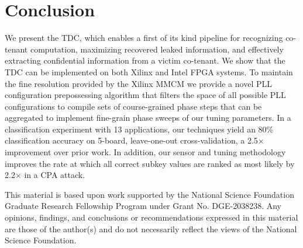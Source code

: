 \section{Conclusion}
\label{conclusion}


We present the \name TDC, which enables a first of its kind pipeline for recognizing co-tenant computation, maximizing recovered leaked information, and effectively extracting confidential information from a victim co-tenant. We show that the \name TDC can be implemented on both Xilinx and Intel FPGA systems. To maintain the fine resolution provided by the Xilinx MMCM we provide a novel PLL configuration prepossessing algorithm that filters the space of all possible PLL configurations to compile sets of course-grained phase steps that can be aggregated to implement fine-grain phase sweeps of our tuning parameters. In a classification experiment with 13 applications, our techniques yield an 80\% classification accuracy on 5-board, leave-one-out cross-validation, a 2.5$\times$ improvement over prior work. In addition, our sensor and tuning methodology improves the rate at which all correct subkey values are ranked as most likely by 2.2$\times$ in a CPA attack. 

\begin{acks}
This material is based upon work supported by the National Science Foundation Graduate Research Fellowship Program under Grant No. DGE-2038238. 
Any opinions, findings, and conclusions or recommendations expressed in this material are those of the author(s) and do not necessarily reflect the views of the National Science Foundation.
\end{acks}

